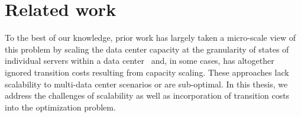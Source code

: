 
\section{Related work}
To the best of our knowledge, prior work has largely taken a micro-scale view of this problem by scaling the data center capacity at the granularity of states of individual servers within a data center~\cite{Li:Optimal:TSG:2012,LinInfocom11,serverEnergy,Mazzucco2012415,rao2010,qureshi2009cutting} and, in some cases, has altogether ignored transition costs resulting from capacity scaling. These approaches lack scalability to multi-data center scenarios or are sub-optimal. In this thesis, we address the challenges of scalability as well as incorporation of transition costs into the optimization problem.

